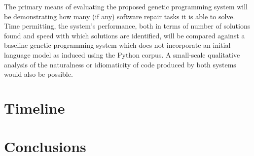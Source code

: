 \documentclass[a4paper,11pt]{proposal}
\begin{document}
The primary means of evaluating the proposed genetic programming system will be demonstrating how many (if any) software repair tasks it is able to solve. Time permitting, the system's performance, both in terms of number of solutions found and speed with which solutions are identified, will be compared against a baseline genetic programming system which does not incorporate an initial language model as induced using the Python corpus. A small-scale qualitative analysis of the naturalness or idiomaticity of code produced by both systems would also be possible.


\section{Timeline}

\section{Conclusions}

\newpage


\end{document}
